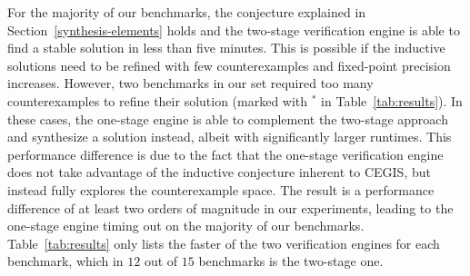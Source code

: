 \documentclass{sig-alternate-05-2015}
\begin{document}
For the majority of our benchmarks, the conjecture explained in
Section~\ref{synthesis-elements} holds and the two-stage verification 
engine %
is able to find a stable solution in less than five minutes.  This is possible if the
inductive solutions need to be refined with few counterexamples and
fixed-point precision increases.  However, two benchmarks in our set
required too many counterexamples to refine their solution (marked with $^*$
in Table~\ref{tab:results}).  In these cases, the one-stage engine 
is able to complement the two-stage approach and synthesize a solution
instead, albeit with significantly larger runtimes.  This performance
difference is due to the fact that the one-stage verification engine does
not take advantage of the inductive conjecture inherent to CEGIS, but
instead fully explores the counterexample space.  The result is a
performance difference of at least two orders of magnitude in our
experiments, leading to the one-stage engine timing out on the majority of
our benchmarks.  Table~\ref{tab:results} only lists the faster of the two
verification engines for each benchmark, which in $12$ out of $15$
benchmarks is the two-stage one.
\end{document}
